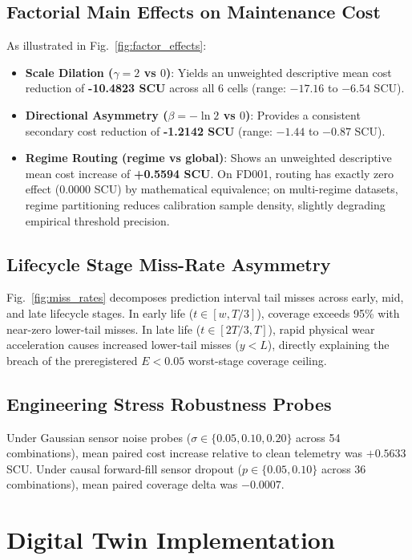 \documentclass[conference,a4paper]{IEEEtran}
\begin{document}
\subsection{Factorial Main Effects on Maintenance Cost}
As illustrated in Fig.~\ref{fig:factor_effects}:
\begin{itemize}
    \item \textbf{Scale Dilation ($\gamma=2$ vs $0$)}: Yields an unweighted descriptive mean cost reduction of \textbf{-10.4823 SCU} across all 6 cells (range: $-17.16$ to $-6.54$ SCU).
    \item \textbf{Directional Asymmetry ($\beta=-\ln 2$ vs $0$)}: Provides a consistent secondary cost reduction of \textbf{-1.2142 SCU} (range: $-1.44$ to $-0.87$ SCU).
    \item \textbf{Regime Routing (regime vs global)}: Shows an unweighted descriptive mean cost increase of \textbf{+0.5594 SCU}. On FD001, routing has exactly zero effect ($0.0000$ SCU) by mathematical equivalence; on multi-regime datasets, regime partitioning reduces calibration sample density, slightly degrading empirical threshold precision.
\end{itemize}

\subsection{Lifecycle Stage Miss-Rate Asymmetry}
Fig.~\ref{fig:miss_rates} decomposes prediction interval tail misses across early, mid, and late lifecycle stages. In early life ($t \in [w, T/3]$), coverage exceeds 95\% with near-zero lower-tail misses. In late life ($t \in [2T/3, T]$), rapid physical wear acceleration causes increased lower-tail misses ($y < L$), directly explaining the breach of the preregistered $E < 0.05$ worst-stage coverage ceiling.

\subsection{Engineering Stress Robustness Probes}
Under Gaussian sensor noise probes ($\sigma \in \{0.05, 0.10, 0.20\}$ across 54 combinations), mean paired cost increase relative to clean telemetry was $+0.5633$ SCU. Under causal forward-fill sensor dropout ($p \in \{0.05, 0.10\}$ across 36 combinations), mean paired coverage delta was $-0.0007$.

\section{Digital Twin Implementation}
\end{document}
